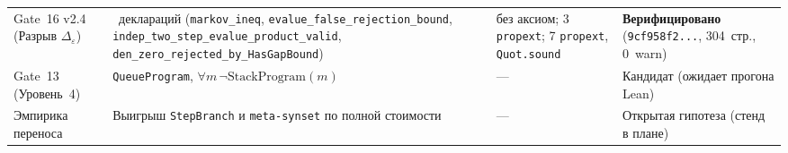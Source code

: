 \documentclass[11pt,a4paper]{article}
\theoremstyle{preprintthm}
\theoremstyle{preprintdef}
\begin{document}
\begin{table}[!htbp]
\begin{tabularx}{\linewidth}{@{}p{26mm}>{\hsize=1.25\hsize\raggedright\arraybackslash}X>{\hsize=0.85\hsize\raggedright\arraybackslash}X>{\hsize=0.90\hsize\raggedright\arraybackslash}X@{}}
Gate~16 v2.4 (Разрыв $\Delta_\varepsilon$) & 11~деклараций (\texttt{markov\_\allowbreak ineq}, \texttt{evalue\_\allowbreak false\_\allowbreak rejection\_\allowbreak bound}, \texttt{indep\_\allowbreak two\_\allowbreak step\_\allowbreak evalue\_\allowbreak product\_\allowbreak valid}, \texttt{den\_\allowbreak zero\_\allowbreak rejected\_\allowbreak by\_\allowbreak HasGapBound}) & 1 без аксиом; 3 \texttt{propext}; 7 \texttt{propext}, \texttt{Quot.sound} & \textbf{Верифицировано}~\cite{strand2026g16} (\texttt{9cf958f2...}, 304~стр., 0~warn) \\
Gate~13 (Уровень~4) & \texttt{QueueProgram}, $\forall m\,\neg\mathrm{StackProgram}(m)$ & --- & Кандидат (ожидает прогона Lean) \\
Эмпирика переноса & Выигрыш \texttt{StepBranch} и \texttt{meta-synset} по полной стоимости & --- & Открытая гипотеза (стенд в плане) \\
\bottomrule
\end{tabularx}
\end{table}
\end{document}
